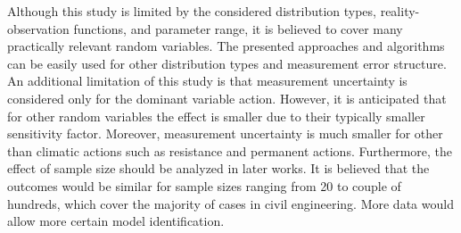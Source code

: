 Although this study is limited by the considered distribution types, reality-observation functions, and parameter range, it is believed to cover many practically relevant random variables. The presented approaches and algorithms can be easily used for other distribution types and measurement error structure. An additional limitation of this study is that measurement uncertainty is considered only for the dominant variable action. However, it is anticipated that for other random variables the effect is smaller due to their typically smaller sensitivity factor. Moreover, measurement uncertainty is much smaller for other than climatic actions such as resistance and permanent actions. Furthermore, the effect of sample size should be analyzed in later works. It is believed that the outcomes would be similar for sample sizes ranging from 20 to couple of hundreds, which cover the majority of cases in civil engineering. More data would allow more certain model identification.


